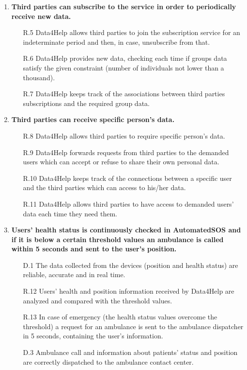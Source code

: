 \documentclass[a4paper]{article}
\begin{document}
\begin{enumerate}[label*=\bf{G.\arabic*}]
        
    \item \textbf{Third parties can subscribe to the service in order to periodically receive new data.}
    
    \begin{enumerate}
        \item [R.5] Data4Help allows third parties to join the subscription service for an indeterminate period and then, in case, unsubscribe from that.
        \item [R.6] Data4Help provides new data, checking each time if groups data satisfy the given constraint (number of individuals not lower than a thousand).
        \item [R.7] Data4Help keeps track of the associations between third parties subscriptions and the required group data.
    \end{enumerate}
    
    
    \item \textbf{Third parties can receive specific person's data.}
            
    \begin{enumerate}
        \item[R.8] Data4Help allows third parties to require specific person's data. 
        \item [R.9] Data4Help forwards requests from third parties to the demanded users which can accept or refuse to share their own personal data.
        \item [R.10] Data4Help keeps track of the connections between a specific user and the third parties which can access to his/her data.
        \item [R.11] Data4Help allows third parties to have access to demanded users' data each time they need them.
    \end{enumerate}
            
        
    \item \textbf{Users' health status is continuously checked in AutomatedSOS and if it is below a certain threshold values an ambulance is called within 5 seconds and sent to the user's position.}

    \begin{enumerate}
        \item [D.1] The data collected from the devices (position and health status) are reliable, accurate and in real time.
        \item [R.12] Users' health and position information received by Data4Help are analyzed and compared with the threshold values.
        \item [R.13] In case of emergency (the health status values overcome the threshold) a request for an ambulance is sent to the ambulance dispatcher in 5 seconds, containing the user's information.
        \item [D.3] Ambulance call and information about patients' status and position are correctly dispatched to the ambulance contact center.
    \end{enumerate}
    

\end{enumerate}
\end{document}
